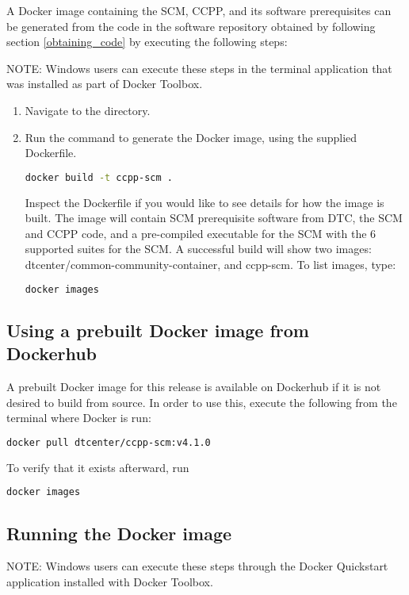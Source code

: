 A Docker image containing the SCM, CCPP, and its software prerequisites can be generated from the code in the software repository obtained by following section \ref{obtaining_code} by executing the following steps:

NOTE: Windows users can execute these steps in the terminal application that was installed as part of Docker Toolbox.

\begin{enumerate}
\item Navigate to the  directory.
\item Run the  command to generate the Docker image, using the supplied Dockerfile.
\begin{lstlisting}[language=bash]
docker build -t ccpp-scm .
\end{lstlisting}
Inspect the Dockerfile if you would like to see details for how the image is built. The image will contain SCM prerequisite software from DTC, the SCM and CCPP code, and a pre-compiled executable for the SCM with the 6 supported suites for the SCM. A successful build will show two images: dtcenter/common-community-container, and ccpp-scm. To list images, type:
\begin{lstlisting}[language=bash]
docker images
\end{lstlisting}
\end{enumerate}

\subsection{Using a prebuilt Docker image from Dockerhub}

A prebuilt Docker image for this release is available on Dockerhub if it is not desired to build from source. In order to use this, execute the following from the terminal where Docker is run:
\begin{lstlisting}[language=bash]
docker pull dtcenter/ccpp-scm:v4.1.0
\end{lstlisting}
To verify that it exists afterward, run
\begin{lstlisting}[language=bash]
docker images
\end{lstlisting}

\subsection{Running the Docker image}

NOTE: Windows users can execute these steps through the Docker Quickstart application installed with Docker Toolbox.

